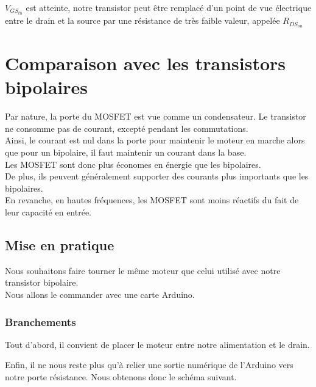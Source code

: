       $V_{GS_{th}}$ est atteinte, notre transistor peut être remplacé d'un point de vue électrique entre le drain et la source par une résistance de très faible valeur, appelée $R_{DS_{on}}$

    \section{Comparaison avec les transistors bipolaires}

    Par nature, la porte du MOSFET est vue comme un condensateur. Le transistor ne consomme pas de courant, excepté pendant les commutations.\\
    Ainsi, le courant est nul dans la porte pour maintenir le moteur en marche alors que pour un bipolaire, il faut maintenir un courant dans la base.\\

    Les MOSFET sont donc plus économes en énergie que les bipolaires.\\
    De plus, ils peuvent généralement supporter des courants plus importants que les bipolaires.\\

    En revanche, en hautes fréquences, les MOSFET sont moins réactifs du fait de leur capacité en entrée.
     \subsection{Mise en pratique}

     Nous souhaitons faire tourner le même moteur que celui utilisé avec notre transistor bipolaire.\\
     Nous allons le commander avec une carte Arduino.

     \subsubsection{Branchements}

     Tout d'abord, il convient de placer le moteur entre notre alimentation et le drain.\\
     
 
 
     Enfin, il ne nous reste plus qu'à relier une sortie numérique de l'Arduino vers notre porte  résistance. Nous obtenons donc le schéma suivant.
 
